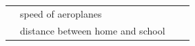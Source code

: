 {{\begin{center}
\begin{tabular}[t]{|l|l|l|l|}
    
         &
    
    
        speed of aeroplanes &
    
    
         &
    
    
     \tabularnewline\cline{1-1}\cline{2-2}\cline{3-3}\cline{4-4}
    
    
         &
    
    
        distance between home and school &
    
    
         &
    
    
     \tabularnewline\cline{1-1}\cline{2-2}\cline{3-3}\cline{4-4}
    

\end{tabular}
\end{center}}}
